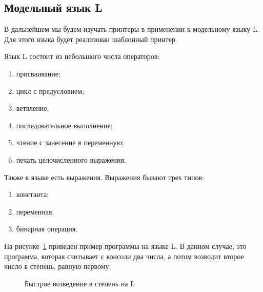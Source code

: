 \subsection{Модельный язык L}

В дальнейшем мы будем изучать принтеры в применении к модельному языку L. Для этого языка будет реализован шаблонный принтер.

Язык L состоит из небольшого числа операторов:
\begin{enumerate}
	\item присваивание;
	\item цикл с предусловием;
	\item ветвление;
	\item последовательное выполнение;
	\item чтение с занесение в переменную;
	\item печать целочисленного выражения.
\end{enumerate}

Также в языке есть выражения. Выражения бывают трех типов:
\begin{enumerate}
	\item константа;
	\item переменная;
	\item бинарная операция.
\end{enumerate}

На рисунке~\ref{fig:lEx} приведен пример программы на языке L. В данном случае, это программа, которая считывает с консоли два числа, а потом возводит второе число в степень, равную первому.

\begin{figure}[h!]
	\centering
	
	\caption{Быстрое возведение в степень на L}
	\label{fig:lEx}
\end{figure}